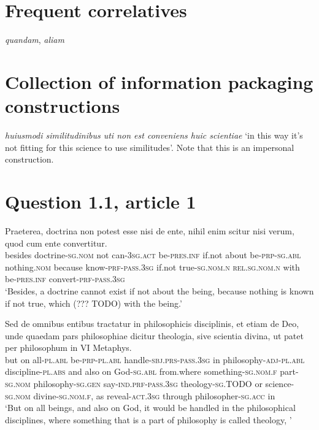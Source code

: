 \documentclass[a4paper, 12pt]{article}
\newcommand{\form}[1]{\emph{#1}}
\newcommand*{\category}[1]{\textsc{#1}}
\newcommand{\translate}[1]{`#1'}
\begin{document}
\section{Frequent correlatives}

\form{quandam}, \form{aliam}

\section{Collection of information packaging constructions}

\form{huiusmodi similitudinibus uti non est conveniens huic scientiae}
\translate{in this way it's not fitting for this science to use similitudes}.
Note that this is an impersonal construction.



\section{Question 1.1, article 1}

\begin{exe}
    \ex \gll Praeterea, doctrina non potest esse nisi de ente, 
    nihil enim scitur nisi verum, 
    quod cum ente convertitur. \\
    besides doctrine-\category{sg.nom} not can-\category{3sg.act} be-\category{pres.inf}
    if.not about be-\category{prp}-\category{sg.abl}
    nothing.\category{nom} because know-\category{prf}-\category{pass.3sg}
    if.not true-\category{sg.nom.n} 
    \category{rel}.\category{sg.nom.n} with be-\category{pres.inf} convert-\category{prf}-\category{pass.3sg} \\
    \translate{Besides, a doctrine cannot exist if not about the being, 
    because nothing is known if not true, 
    which (??? TODO) with the being.}
    
    \ex \gll Sed de omnibus entibus 
    tractatur in philosophicis disciplinis, 
    et etiam de Deo, 
    unde quaedam pars philosophiae dicitur theologia, 
    sive scientia divina, 
    ut patet per philosophum in VI Metaphys. \\
    but on all-\category{pl.abl} be-\category{prp}-\category{pl.abl}  
    handle-\category{sbj.prs}-\category{pass.3sg} in philosophy-\category{adj}-\category{pl.abl} discipline-\category{pl.abs} 
    and also on God-\category{sg.abl}
    from.where something-\category{sg.nom.f} part-\category{sg.nom} philosophy-\category{sg.gen} say-\category{ind.prf}-\category{pass.3sg} theology-\category{sg.TODO} 
    or science-\category{sg.nom} divine-\category{sg.nom.f},
    as reveal-\category{act.3sg} through philosopher-\category{sg.acc} in  \\
    \glt \translate{But on all beings, and also on God, 
    it would be handled in the philosophical disciplines, 
    where something that is a part of philosophy is called theology,
    }
\end{exe}
\end{document}
